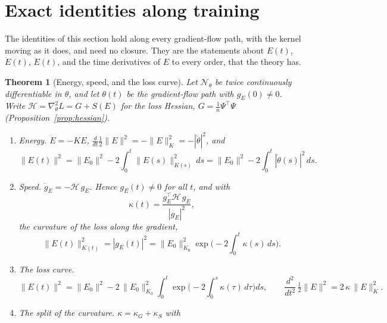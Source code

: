 \documentclass[11pt]{article}
\newtheorem{theorem}{Theorem}
\theoremstyle{definition}
\theoremstyle{remark}
\newcommand{\Net}{\mathcal{N}_\theta}    %
\newcommand{\Hess}{\mathcal{H}}          %
\begin{document}
\section{Exact identities along training}\label{sec:identities}

The identities of this section hold along every gradient-flow path, with the kernel moving as it does, and need no closure.
They are the statements about $E(t)$, $\dot E(t)$, $\ddot E(t)$, and the time derivatives of $E$ to every order, that the theory has.

\begin{theorem}[Energy, speed, and the loss curve]\label{thm:identities}
Let $\Net$ be twice continuously differentiable in $\theta$, and let $\theta(t)$ be the gradient-flow path with $g_E(0)\ne0$.
Write $\Hess = \nabla^2_\theta L = G + S(E)$ for the loss Hessian, $G = \frac1n\Psi^\top\Psi$ (Proposition~\ref{prop:hessian}).
\begin{enumerate}[label=(\alph*)]
\item \emph{Energy.} $\dot E = -KE$, $\frac{d}{dt}\frac12\|E\|^2 = -\|E\|_K^2 = -|\dot\theta|^2$, and
\begin{equation}\label{eq:energy}
\|E(t)\|^2 = \|E_0\|^2 - 2\int_0^t\|E(s)\|_{K(s)}^2\,ds = \|E_0\|^2 - 2\int_0^t|\dot\theta(s)|^2\,ds .
\end{equation}
\item \emph{Speed.} $\dot g_E = -\Hess\,g_E$. Hence $g_E(t)\ne0$ for all $t$, and with
\begin{equation}\label{eq:kappa}
\kappa(t) = \frac{g_E^\top\Hess\,g_E}{|g_E|^2},
\end{equation}
the curvature of the loss along the gradient,
\begin{equation}\label{eq:speed}
\|E(t)\|_{K(t)}^2 = |g_E(t)|^2 = \|E_0\|_{K_0}^2\exp\Big(-2\int_0^t\kappa(s)\,ds\Big).
\end{equation}
\item \emph{The loss curve.}
\begin{equation}\label{eq:losscurve}
\|E(t)\|^2 = \|E_0\|^2 - 2\,\|E_0\|_{K_0}^2\int_0^t\exp\Big(-2\int_0^s\kappa(\tau)\,d\tau\Big)ds ,
\qquad
\frac{d^2}{dt^2}\,\tfrac12\|E\|^2 = 2\,\kappa\,\|E\|_K^2 .
\end{equation}
\item \emph{The split of the curvature.} $\kappa = \kappa_G + \kappa_S$ with
\begin{equation}\label{eq:kappasplit}

\end{equation}
\end{enumerate}
\end{theorem}
\end{document}
